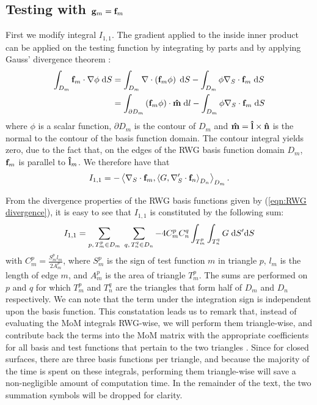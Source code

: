 \subsection{Testing with $\mathbf{g}_m = \mathbf{f}_m$}
%
\par
First we modify integral $I_{1,1}$. The gradient applied to the inside inner product can be applied on the testing function by integrating by parts and by applying Gauss' divergence theorem \cite{Rao_82, Taskinen_03}:
\begin{equation} \label{eqn:Gauss' divergence theorem}
\begin{split}
\int_{D_m} \mathbf{f}_m \cdot \nabla \phi \; \text{d} S &= \int_{D_m} \nabla \cdot \left( \mathbf{f}_m \phi \right) \; \text{d} S - \int_{D_m} \phi \nabla_S \cdot \mathbf{f}_m \; \text{d} S \\
&= \int_{\partial D_m} \left(\mathbf{f}_m \phi \right) \cdot \mathbf{\Hat{m}} \; \text{d} l - \int_{D_m} \phi \nabla_S \cdot \mathbf{f}_m \; \text{d} S
\end{split}
\end{equation}
where $\phi$ is a scalar function, $\partial D_m$ is the contour of $D_m$ and $\mathbf{\Hat{m}} = \mathbf{\Hat{l}} \times \mathbf{\Hat{n}}$ is the normal to the contour of the basis function domain. The contour integral yields zero, due to the fact that, on the edges of the RWG basis function domain $D_m$, $\mathbf{f}_m$ is parallel to $\mathbf{\Hat{l}}_m$. We therefore have that
\begin{equation}
I_{1,1} = - \left\langle \nabla_S \cdot \mathbf{f}_m , \left\langle G , \nabla_S^\prime \cdot \mathbf{f}_n \right\rangle_{D_n} \right\rangle_{D_m}.
\end{equation}
%
\par
From the divergence properties of the RWG basis functions given by (\ref{eqn:RWG divergence}), it is easy to see that $I_{1,1}$ is constituted by the following sum:
\begin{equation} \label{eqn:MoM scalar potential term}
I_{1,1} = \sum_{p, \, T_m^p \in D_m} \; \sum_{q, \, T_n^q \in D_n} -4 C_m^p C_n^q \int_{T_m^p} \int_{T_n^q} G \; \text{d} S' \text{d} S
\end{equation}
with $C_m^p = \frac{S_m^p l_m}{2 A_m^p}$, where $S_m^p$ is the sign of test function $m$ in triangle $p$, $l_m$ is the length of edge $m$, and $A_m^p$ is the area of triangle $T_m^p$. The sums are performed on $p$ and $q$ for which $T_m^p$ and $T_n^q$ are the triangles that form half of $D_m$ and $D_n$ respectively. We can note that the term under the integration sign is independent upon the basis function. This constatation leads us to remark that, instead of evaluating the MoM integrals RWG-wise, we will perform them triangle-wise, and contribute back the terms into the MoM matrix with the appropriate coefficients for all basis and test functions that pertain to the two triangles \cite{Rao_82}. Since for closed surfaces, there are three basis functions per triangle, and because the majority of the time is spent on these integrals, performing them triangle-wise will save a non-negligible amount of computation time. In the remainder of the text, the two summation symbols will be dropped for clarity.
